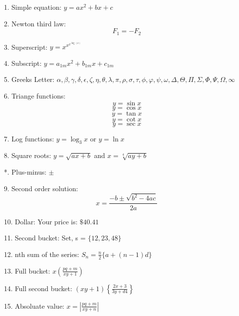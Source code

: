 \documentclass[11pt]{article}
\begin{document}
1. Simple equation: $y = ax^2 + bx + c$

2. Newton third law: $$F_1 = -F_2$$

3. Superscript: $y = x^{x^{x^{\log(x)}}}$

4. Subscript: $y = a_{1m}x^2+b_{1m}x+c_{1m}$

5. Greeks Letter: $\alpha, \beta, \gamma, \delta, \epsilon, \zeta, \eta, \theta, \lambda, \pi, \rho, \sigma, \tau, \phi, \varphi, \psi, \omega, \Delta, \Theta, \Pi, \Sigma, \Phi, \Psi, \Omega, \infty$

6. Triange functions: $$y = \sin{x}$$
					  $$y = \cos{x}$$
					  $$y = \tan{x}$$
					  $$y = \cot{x}$$
					  $$y = \sec{x}$$
					  
7. Log functions: $y = \log_3{x}$ or $y = \ln{x}$

8. Square roots: $y = \sqrt{ax + b}$ and $x = \sqrt[4]{ay + b}$

*. Plus-minus: $\pm$

9. Second order solution: $$x = \frac{-b \pm \sqrt{b^2 - 4ac}}{2a}$$

10. Dollar: Your price is: $\$40.41$

11. Second bucket: Set, s = $\{12, 23, 48\}$

12. nth sum of the series: $S_n = \displaystyle{\frac{n}{2}}\{a + (n - 1)d\}$

13. Full bucket: $x\left(\frac{pq+m}{xy+1}\right)$

14. Full second bucket: $\left(xy+1\right)\left\{\frac{2x+3}{3y+d4}\right\}$

15. Absoluate value: $x = \left|\displaystyle{\frac{pq+m}{xy+n}}\right|$
\end{document}
